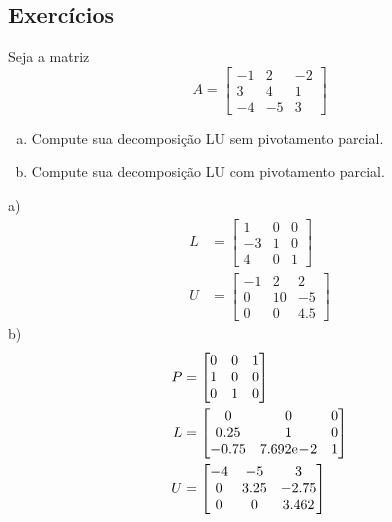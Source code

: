 \subsection{Exercícios}

\begin{exer}
  Seja a matriz
  \begin{equation}
    A =
    \begin{bmatrix}
      -1 & 2 & -2\\
      3 & 4 & 1\\
      -4 & -5 & 3
    \end{bmatrix}
  \end{equation}
  \begin{enumerate}[a)]
  \item Compute sua decomposição LU sem pivotamento parcial.
  \item Compute sua decomposição LU com pivotamento parcial.
  \end{enumerate}
\end{exer}
\begin{resp}
  a)
  \begin{align}
    L &=
        \begin{bmatrix}
          1 & 0 & 0\\
          -3 & 1 & 0\\
          4 & 0 & 1
        \end{bmatrix}\\
    U &=
        \begin{bmatrix}
          -1 & 2 & 2\\
          0 & 10 & -5\\
          0 & 0 & 4.5
        \end{bmatrix}
  \end{align}
  b)
  \begin{align}
    P &=
        \begin{bmatrix}
          0 & 0 & 1\\
          1 & 0 & 0\\
          0 & 1 & 0
        \end{bmatrix}\\
    L &=
        \begin{bmatrix}
              0  & 0 & 0\\
           0.25  & 1 & 0\\
          -0.75  & 7.692\mathrm{e}\!-\!2 & 1
        \end{bmatrix}\\
    U &=
        \begin{bmatrix}
          -4 & -5 & 3\\
          0 & 3.25 & -2.75\\
          0 & 0 & 3.462
        \end{bmatrix}
  \end{align}  
\end{resp}

